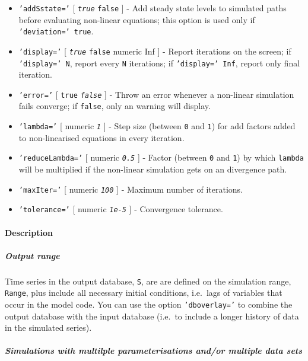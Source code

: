 \begin{itemize}
\item
  \texttt{'addSstate='} {[} \emph{\texttt{true}} \textbar{}
  \texttt{false} {]} - Add steady state levels to simulated paths before
  evaluating non-linear equations; this option is used only if
  \texttt{'deviation=' true}.
\item
  \texttt{'display='} {[} \emph{\texttt{true}} \textbar{} \texttt{false}
  \textbar{} numeric \textbar{} Inf {]} - Report iterations on the
  screen; if \texttt{'display=' N}, report every \texttt{N} iterations;
  if \texttt{'display=' Inf}, report only final iteration.
\item
  \texttt{'error='} {[} \texttt{true} \textbar{} \emph{\texttt{false}}
  {]} - Throw an error whenever a non-linear simulation fails converge;
  if \texttt{false}, only an warning will display.
\item
  \texttt{'lambda='} {[} numeric \textbar{} \emph{\texttt{1}} {]} - Step
  size (between \texttt{0} and \texttt{1}) for add factors added to
  non-linearised equations in every iteration.
\item
  \texttt{'reduceLambda='} {[} numeric \textbar{} \emph{\texttt{0.5}}
  {]} - Factor (between \texttt{0} and \texttt{1}) by which
  \texttt{lambda} will be multiplied if the non-linear simulation gets
  on an divergence path.
\item
  \texttt{'maxIter='} {[} numeric \textbar{} \emph{\texttt{100}} {]} -
  Maximum number of iterations.
\item
  \texttt{'tolerance='} {[} numeric \textbar{} \emph{\texttt{1e-5}} {]}
  - Convergence tolerance.
\end{itemize}

\paragraph{Description}\label{description}

\subparagraph{Output range}\label{output-range}

Time series in the output database, \texttt{S}, are are defined on the
simulation range, \texttt{Range}, plus include all necessary initial
conditions, i.e.~lags of variables that occur in the model code. You can
use the option \texttt{'dboverlay='} to combine the output database with
the input database (i.e.~to include a longer history of data in the
simulated series).

\subparagraph{Simulations with multilple parameterisations and/or
multiple data
sets}\label{simulations-with-multilple-parameterisations-andor-multiple-data-sets}

